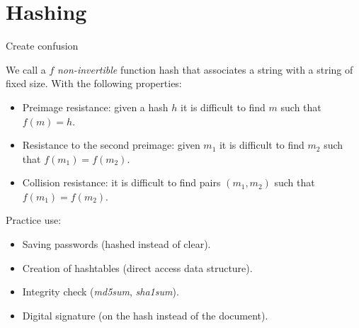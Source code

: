 \documentclass[handout, xcolor=dvipsnames,aspectratio=169]{beamer}
\begin{document}

\part{Hashing}

\begin{frame}
	\partpage
	\centering
\end{frame}

\begin{frame}{Create confusion}

\pause

We call a $f$ \textit{non-invertible} function hash that associates a string with a string of fixed size. With the following properties:

\pause

\begin{itemize}
  \item Preimage resistance: given a hash $h$ it is difficult to find $ m $ such that $ f (m) = h $.
  \item Resistance to the second preimage: given $ m_1 $ it is difficult to find $ m_2 $ such that $ f (m_1) = f (m_2) $.
  \item Collision resistance: it is difficult to find pairs $ (m_1, m_2) $ such that $ f (m_1) = f (m_2) $.
\end{itemize}

\pause

Practice use:

\begin{itemize}
  \item Saving passwords (hashed instead of clear).
  \item Creation of hashtables (direct access data structure).
  \item Integrity check (\textit {md5sum}, \textit {sha1sum}).
  \item Digital signature (on the hash instead of the document).
\end{itemize}

\end{frame}
\end{document}
